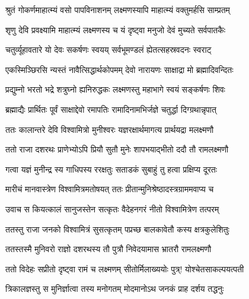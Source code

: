 
\notes{}
\textlink{}
\translink{}

\storymeta



\twolineshloka
{श्रुतं गोकर्णमाहात्म्यं वसो पापविनाशनम्}
{लक्ष्मणस्यापि माहात्म्यं वक्तुमर्हसि साम्प्रतम्}%


\twolineshloka
{शृणु देवि प्रवक्ष्यामि माहात्म्यं लक्ष्मणस्य च}
{यं दृष्ट्वा मनुजो देवं मुच्यते सर्वपातकैः}%

\twolineshloka
{चतुर्व्यूहावतारे यो देवः सकर्षणः स्वयय्}
{सर्वभूमण्डलं ह्येतत्सहस्रवदनः स्वराट्}%

\twolineshloka
{एकस्मिञ्छिरसि न्यस्तं नावैत्सिद्धार्थकोपमम्}
{देवो नारायणः साक्षाद्रा मो ब्रह्मादिवन्दितः}%

\twolineshloka
{प्रद्युम्नो भरतो भद्रे शत्रुघ्नो ह्यनिरुद्धकः}
{लक्ष्मणस्तु महाभागे स्वयं सङ्कर्षणः शिवः}%

\twolineshloka
{ब्रह्माद्यैः प्रार्थितः पूर्वं साक्षाद्देवो रमापतिः}
{रामादिनामभिर्जज्ञे चतुर्द्धा दिग्ग्रथान्नृपात्}%

\twolineshloka
{ततः कालान्तरे देवि विश्वामित्रो मुनीश्वरः}
{यज्ञरक्षार्थमागत्य प्रार्थयद्रा मलक्ष्मणौ}%

\twolineshloka
{ततो राजा दशरथः प्राणेभ्योऽपि प्रियौ सुतौ}
{मुनेः शापभयाद्भीतो ददौ तौ रामलक्ष्मणौ}%

\twolineshloka
{गत्वा यज्ञं मुनीन्द्र स्य गाधिपस्य ररक्षतुः}
{सताडकं सुबाहुं तु हत्वा प्रक्षिप्य दूरतः}%

\twolineshloka
{मारीचं मानवास्त्रेण विश्वामित्रमतोषयत्}
{ततः प्रीतान्मुनिश्रेष्ठादस्त्रग्राममवाप्य च}%

\twolineshloka
{उवाच स कियत्कालं सानुजस्तेन सत्कृतः}
{वैदेहनगरं नीतो विश्वामित्रेण तत्परम्}%

\twolineshloka
{ततस्तु राजा जनको विश्वामित्रं सुसत्कृतम्}
{पप्रच्छ बालकावेतौ कस्य क्षत्रकुलेशितुः}%

\twolineshloka
{ततस्तस्मै मुनिवरो राज्ञो दशरथस्य तौ}
{पुत्रौ निवेदयामास भ्रातरौ रामलक्ष्मणौ}%

\twolineshloka
{ततो विदेहः सप्रीतो दृष्ट्वा रामं च लक्ष्मणम्}
{सीतोर्मिलाख्ययोः पुत्र्! योश्चेतसाकल्पयत्पती}%

\twolineshloka
{त्रिकालज्ञस्तु स मुनिर्ज्ञात्वा तस्य मनोगतम्}
{मोदमानोऽथ जनकं प्राह दर्शय तद्धनुः}%

